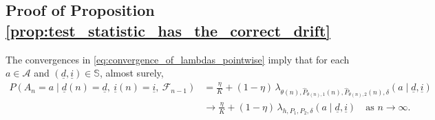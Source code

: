 \subsection{Proof of Proposition \ref{prop:test_statistic_has_the_correct_drift}}
\label{appndx:proof_of_prop_test_statistic_has_the_correct_drift}
The convergences in \eqref{eq:convergence_of_lambdas_pointwise} imply that for each $a\in \mathcal{A}$ and $(\underline{d}, \underline{i}) \in \mathbb{S}$, almost surely,
\begin{align}
	P(A_n=a \mid \underline{d}(n)=\underline{d},~ \underline{i}(n)=\underline{i},~ \mathcal{F}_{n-1}) &= \frac{\eta}{K} + (1-\eta)\, \lambda_{\theta(n), \hat{P}_{\theta(n), 1}(n), \hat{P}_{\theta(n), 2}(n), \delta}(a \mid \underline{d}, \underline{i})\nonumber\\
	&\longrightarrow \frac{\eta}{K} + (1-\eta)\, \lambda_{h, P_1, P_2, \delta}(a \mid \underline{d}, \underline{i})\quad \text{as }n \to \infty.
	\label{eq:convergence_of_arm_selection_probabilities}
\end{align}

